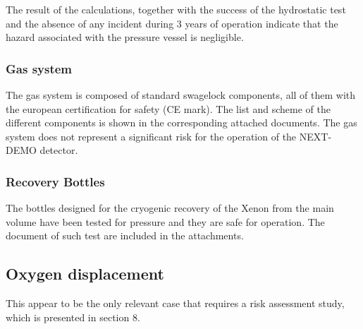 The result of the calculations, together with the success of the hydrostatic test and the absence of any incident during 3 years of operation indicate that the hazard associated with the pressure vessel is negligible. 

\subsubsection{Gas system}
The gas system is composed of standard swagelock components, all of them with the european certification for safety (CE mark). The list and scheme of the different components is shown in the corresponding attached documents. The gas system does not represent a significant risk for the operation of the NEXT-DEMO detector.

\subsubsection{Recovery Bottles}

The bottles designed for the cryogenic recovery of the Xenon from the main volume have been tested for pressure and they are safe for operation. The document of such test are included in the attachments.

\subsection{Oxygen displacement}
This appear to be the only relevant case that requires a risk assessment study, which is presented in section 8. 


